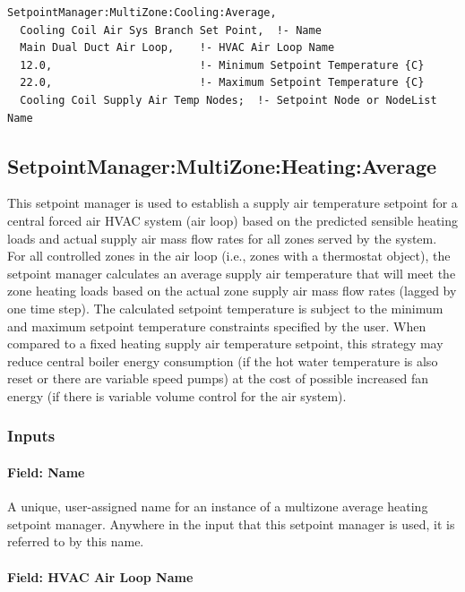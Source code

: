 \begin{lstlisting}
SetpointManager:MultiZone:Cooling:Average,
  Cooling Coil Air Sys Branch Set Point,  !- Name
  Main Dual Duct Air Loop,    !- HVAC Air Loop Name
  12.0,                       !- Minimum Setpoint Temperature {C}
  22.0,                       !- Maximum Setpoint Temperature {C}
  Cooling Coil Supply Air Temp Nodes;  !- Setpoint Node or NodeList Name
\end{lstlisting}

\subsection{SetpointManager:MultiZone:Heating:Average}\label{setpointmanagermultizoneheatingaverage}

This setpoint manager is used to establish a supply air temperature setpoint for a central forced air HVAC system (air loop) based on the predicted sensible heating loads and actual supply air mass flow rates for all zones served by the system. For all controlled zones in the air loop (i.e., zones with a thermostat object), the setpoint manager calculates an average supply air temperature that will meet the zone heating loads based on the actual zone supply air mass flow rates (lagged by one time step). The calculated setpoint temperature is subject to the minimum and maximum setpoint temperature constraints specified by the user. When compared to a fixed heating supply air temperature setpoint, this strategy may reduce central boiler energy consumption (if the hot water temperature is also reset or there are variable speed pumps) at the cost of possible increased fan energy (if there is variable volume control for the air system).

\subsubsection{Inputs}\label{inputs-15-013}

\paragraph{Field: Name}\label{field-name-15-008}

A unique, user-assigned name for an instance of a multizone average heating setpoint manager. Anywhere in the input that this setpoint manager is used, it is referred to by this name.

\paragraph{Field: HVAC Air Loop Name}\label{field-hvac-air-loop-name-5}

